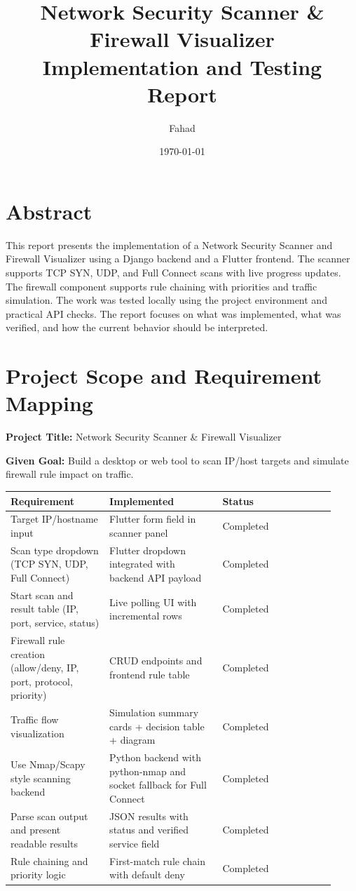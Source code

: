 \documentclass[12pt,a4paper]{article}
\title{Network Security Scanner \& Firewall Visualizer\\\large Implementation and Testing Report}
\author{Fahad}
\date{\today}
\begin{document}
\maketitle

\section*{Abstract}
This report presents the implementation of a Network Security Scanner and Firewall Visualizer using a Django backend and a Flutter frontend. The scanner supports TCP SYN, UDP, and Full Connect scans with live progress updates. The firewall component supports rule chaining with priorities and traffic simulation. The work was tested locally using the project environment and practical API checks. The report focuses on what was implemented, what was verified, and how the current behavior should be interpreted.

\section{Project Scope and Requirement Mapping}
\textbf{Project Title:} Network Security Scanner \& Firewall Visualizer

\textbf{Given Goal:} Build a desktop or web tool to scan IP/host targets and simulate firewall rule impact on traffic.

\begin{longtable}{p{0.28\linewidth} p{0.32\linewidth} p{0.32\linewidth}}
\toprule
\textbf{Requirement} & \textbf{Implemented} & \textbf{Status} \\
\midrule
Target IP/hostname input & Flutter form field in scanner panel & Completed \\
Scan type dropdown (TCP SYN, UDP, Full Connect) & Flutter dropdown integrated with backend API payload & Completed \\
Start scan and result table (IP, port, service, status) & Live polling UI with incremental rows & Completed \\
Firewall rule creation (allow/deny, IP, port, protocol, priority) & CRUD endpoints and frontend rule table & Completed \\
Traffic flow visualization & Simulation summary cards + decision table + diagram & Completed \\
Use Nmap/Scapy style scanning backend & Python backend with python-nmap and socket fallback for Full Connect & Completed \\
Parse scan output and present readable results & JSON results with status and verified service field & Completed \\
Rule chaining and priority logic & First-match rule chain with default deny & Completed \\
\bottomrule
\end{longtable}
\end{document}

